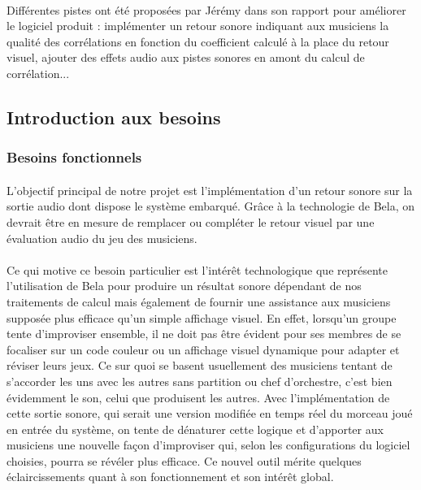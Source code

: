 \paragraph{}
Différentes pistes ont été proposées par Jérémy dans son rapport pour
améliorer le logiciel produit : implémenter un retour sonore indiquant
aux musiciens la qualité des corrélations en fonction du coefficient
calculé à la place du retour visuel, ajouter des effets audio aux
pistes sonores en amont du calcul de corrélation...

\subsection{Introduction aux besoins}

\subsubsection{Besoins fonctionnels}
\paragraph{}
L'objectif principal de notre projet est l'implémentation d'un retour
sonore sur la sortie audio dont dispose le système embarqué. Grâce à
la technologie de Bela, on devrait être en mesure de remplacer ou
compléter le retour visuel par une évaluation audio du jeu des
musiciens.
\paragraph{}
Ce qui motive ce besoin particulier est l'intérêt technologique que
représente l'utilisation de Bela pour produire un résultat sonore
dépendant de nos traitements de calcul mais également de fournir une
assistance aux musiciens supposée plus efficace qu'un simple affichage
visuel. En effet, lorsqu'un groupe tente d'improviser ensemble, il ne
doit pas être évident pour ses membres de se focaliser sur un code
couleur ou un affichage visuel dynamique pour adapter et réviser leurs
jeux. Ce sur quoi se basent usuellement des musiciens tentant de
s'accorder les uns avec les autres sans partition ou chef d'orchestre,
c'est bien évidemment le son, celui que produisent les autres. Avec
l'implémentation de cette sortie sonore, qui serait une version
modifiée en temps réel du morceau joué en entrée du système, on tente
de dénaturer cette logique et d'apporter aux musiciens une nouvelle
façon d'improviser qui, selon les configurations du logiciel choisies,
pourra se révéler plus efficace. Ce nouvel outil mérite quelques
éclaircissements quant à son fonctionnement et son intérêt global.
